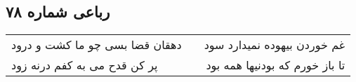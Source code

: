 \begin{center}
\section*{رباعی شماره ۷۸}
\label{sec:sh078}
\begin{longtable}{l p{0.5cm} r}
دهقان قضا بسی چو ما کشت و درود
&&
غم خوردن بیهوده نمیدارد سود
\\
پر کن قدح می به کفم درنه زود
&&
تا باز خورم که بودنیها همه بود
\\
\end{longtable}
\end{center}

